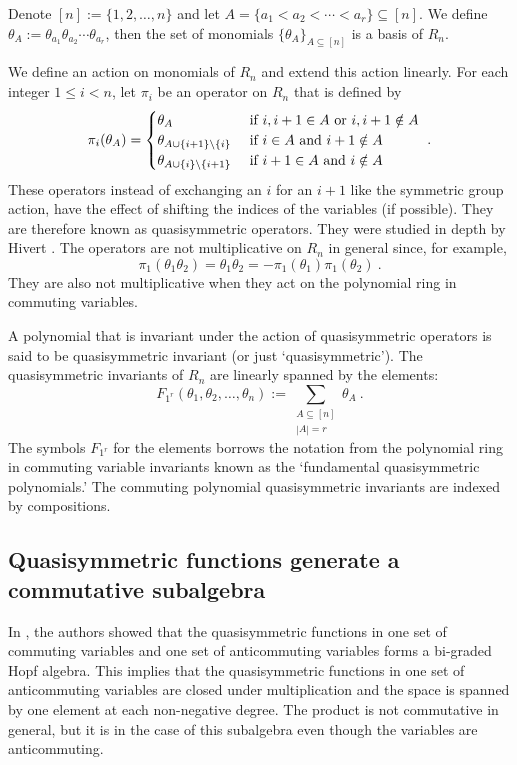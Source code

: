 \documentclass[submission]{FPSAC2023}
\theoremstyle{definition}
\numberwithin{equation}{section}
\begin{document}
Denote $[n] := \{1,2, \ldots,n\}$ and
let $A = \{a_1 < a_2 < \cdots < a_r \} \subseteq [n]$.
We define $\theta_A := \theta_{a_1} \theta_{a_2} \cdots \theta_{a_r}$,
then the set of monomials $\{ \theta_A \}_{A \subseteq [n]}$ is a basis of $R_n$.

We define an action on monomials of $R_n$ and extend this action linearly.
For each integer $1 \leq i < n$, let $\pi_i$ be an operator on $R_n$
that is defined by
\begin{equation}\label{eq:pi}
\pi_i(\theta_A) = \begin{cases}
\theta_{A} & \hbox{ if } i, i+1 \in A\hbox{ or }i, i+1 \notin A\\
\theta_{A \cup \{i+1\} \backslash \{i\}} & \hbox{ if } i\in A\hbox{ and }i+1 \notin A\\
\theta_{A \cup \{i\} \backslash \{i+1\}} & \hbox{ if } i+1\in A\hbox{ and }i \notin A
\end{cases}~.
\end{equation}
These operators instead of exchanging an $i$ for an $i+1$ like the symmetric group
action, have the effect of shifting the indices of the variables (if possible).  They
are therefore known as quasisymmetric operators.  They were studied in depth by
Hivert \cite{Hi}.  The operators are not multiplicative on $R_n$ in general since, for example,
\[
\pi_1( \theta_{1} \theta_{2})
= \theta_1 \theta_2
= - \pi_1( \theta_{1}) \pi_1(\theta_{2})~.
\]
They are also not multiplicative when they act on the polynomial ring
in commuting variables.

A polynomial that is invariant under the action of quasisymmetric operators
is said to be quasisymmetric invariant (or just `quasisymmetric').
The quasisymmetric invariants of $R_n$ are
linearly spanned by the elements:
\begin{equation}\label{eq:defF}
F_{1^r}(\theta_1, \theta_2, \ldots, \theta_n) := \sum_{\substack{A \subseteq [n]\\|A|=r}} \theta_A~.
\end{equation}
The symbols $F_{1^r}$ for the elements borrows the notation from the
polynomial ring in commuting variable invariants known as the `fundamental
quasisymmetric polynomials.'  The commuting polynomial quasisymmetric
invariants are indexed by compositions.

\subsection{Quasisymmetric functions generate a commutative subalgebra}
In \cite{FLP}, the authors showed that the quasisymmetric functions in
one set of commuting variables and one set of anticommuting variables
forms a bi-graded Hopf algebra.  This implies that the quasisymmetric functions
in one set of anticommuting variables are closed under multiplication
and the space is spanned by one element at each non-negative degree.
The product is not commutative in general, but it is in the case of this subalgebra
even though the variables are anticommuting.
\end{document}
